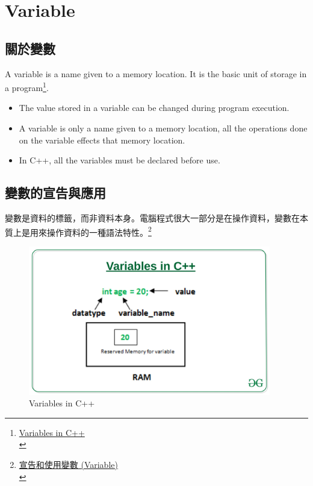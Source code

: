\documentclass[a4paper,12pt]{article}
\begin{document}
\section{Variable}
\label{cpp_variables}
\subsection{關於變數}
\label{sec:orgc3eba6c}
A variable is a name given to a memory location. It is the basic unit of storage in a program\footnote{\href{https://www.geeksforgeeks.org/variables-in-c/}{Variables in C++}\\}.\\
\begin{itemize}
\item The value stored in a variable can be changed during program execution.\\
\item A variable is only a name given to a memory location, all the operations done on the variable effects that memory location.\\
\item In C++, all the variables must be declared before use.\\
\end{itemize}

\subsection{\label{VarDec}變數的宣告與應用}
\label{sec:org1c896de}
變數是資料的標籤，而非資料本身。電腦程式很大一部分是在操作資料，變數在本質上是用來操作資料的一種語法特性。\footnote{\href{https://michaelchen.tech/c-programming/variable/}{宣告和使用變數 (Variable)}\\}\\
\begin{figure}[htbp]
\centering
\includegraphics[width=400]{images/Variables-in-C-1.jpg}
\caption{\label{fig:vic}Variables in C++}
\end{figure}
\end{document}
